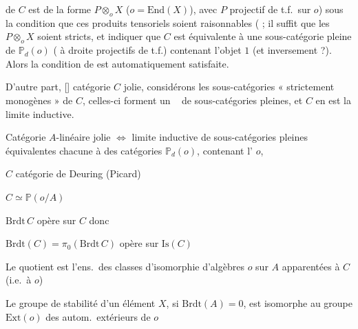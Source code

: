 \documentclass[11pt,a4paper]{article}
\begin{document}

de $C$ est de la forme $P \otimes_{o} X$ ($o = \mathrm{End}(X)$), avec $P$
projectif de t.f.\ sur $o$) sous la condition que ces produits tensoriels
soient raisonnables ( ; il suffit \struck{\ill{}} que les
$P \otimes_{o} X$ soient stricts, et indiquer que $C$ est
équivalente à une sous-catégorie pleine de $\mathbb{P}_{d}(o)$
( à droite projectifs de t.f.) \struck{\ill{}}
contenant l'objet $1$ (et inversement ?). Alors la condition de
 est automatiquement satisfaite.

D'autre part, [] \struck{\ill{}} catégorie \struck{\ill{}} $C$
jolie, considérons  les
sous-catégories « strictement monogènes » de $C$, celles-ci forment un
\  de sous-catégories pleines,
 et $C$ en est la limite inductive.

Catégorie \struck{\ill{}} $A$-linéaire \struck{\ill{}} jolie
$\Longleftrightarrow$ limite inductive de sous-catégories pleines
équivalentes chacune \struck{\ill{}} à des catégories 
$\mathbb{P}_{d}(o)$, contenant l' $o$,

$C$ catégorie de Deuring (Picard)

$C \simeq \mathbb{P}(o/A)$

$\mathrm{Brdt}\, C$ opère sur $C$ donc

$\mathrm{Brdt}(C) = \pi_{0}(\mathrm{Brdt}\, C)$ opère sur $\mathrm{Is}(C)$

Le quotient est l'ens.\ des classes d'isomorphie d'algèbres $o$ sur $A$
apparentées à $C$ (i.e.\ à $o$)

Le groupe de stabilité d'un élément $X$, si $\mathrm{Brdt}(A) = 0$, est
isomorphe au groupe $\mathrm{Ext}(o)$ des autom.\ extérieurs de $o$
\end{document}
